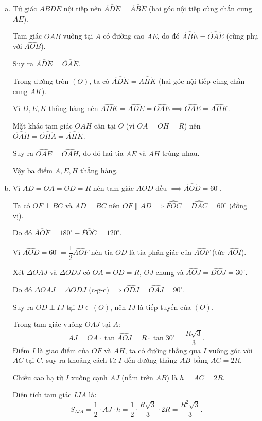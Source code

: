 \begin{bt}
{\begin{enumerate}[a)]
			Suy ra tứ giác $ABDE$ nội tiếp đường tròn đường kính $AB$.
			\item Tứ giác $ABDE$ nội tiếp nên $\widehat{ADE} = \widehat{ABE}$ (hai góc nội tiếp cùng chắn cung $AE$).
			
			Tam giác $OAB$ vuông tại $A$ có đường cao $AE$, do đó $\widehat{ABE} = \widehat{OAE}$ (cùng phụ với $\widehat{AOB}$).
			
			Suy ra $\widehat{ADE} = \widehat{OAE}$.
			
			Trong đường tròn $(O)$, ta có $\widehat{ADK} = \widehat{AHK}$ (hai góc nội tiếp cùng chắn cung $AK$).
			
			Vì $D, E, K$ thẳng hàng nên $\widehat{ADK} = \widehat{ADE} = \widehat{OAE} \implies \widehat{OAE} = \widehat{AHK}$.
			
			Mặt khác tam giác $OAH$ cân tại $O$ (vì $OA = OH = R$) nên $\widehat{OAH} = \widehat{OHA} = \widehat{AHK}$.
			
			Suy ra $\widehat{OAE} = \widehat{OAH}$, do đó hai tia $AE$ và $AH$ trùng nhau.
			
			Vậy ba điểm $A, E, H$ thẳng hàng.
			\item Vì $AD = OA = OD = R$ nên tam giác $AOD$ đều $\implies \widehat{AOD} = 60^\circ$.
			
			Ta có $OF \perp BC$ và $AD \perp BC$ nên $OF \parallel AD \implies \widehat{FOC} = \widehat{DAC} = 60^\circ$ (đồng vị).
			
			Do đó $\widehat{AOF} = 180^\circ - \widehat{FOC} = 120^\circ$.
			
			Vì $\widehat{AOD} = 60^\circ = \dfrac{1}{2}\widehat{AOF}$ nên tia $OD$ là tia phân giác của $\widehat{AOF}$ (tức $\widehat{AOI}$).
			
			Xét $\Delta OAJ$ và $\Delta ODJ$ có $OA = OD = R$, $OJ$ chung và $\widehat{AOJ} = \widehat{DOJ} = 30^\circ$.
			
			Do đó $\Delta OAJ = \Delta ODJ\text{ (c-g-c)} \implies \widehat{ODJ} = \widehat{OAJ} = 90^\circ$.
			
			Suy ra $OD \perp IJ$ tại $D \in (O)$, nên $IJ$ là tiếp tuyến của $(O)$.
			
			Trong tam giác vuông $OAJ$ tại $A$:
			$$AJ = OA \cdot \tan\widehat{AOJ} = R \cdot \tan 30^\circ = \dfrac{R\sqrt{3}}{3}.$$
			Điểm $I$ là giao điểm của $OF$ và $AH$, ta có đường thẳng qua $I$ vuông góc với $AC$ tại $C$, suy ra khoảng cách từ $I$ đến đường thẳng $AB$ bằng $AC = 2R$.
			
			Chiều cao hạ từ $I$ xuống cạnh $AJ$ (nằm trên $AB$) là $h = AC = 2R$.
			
			Diện tích tam giác $IJA$ là:
			$$S_{IJA} = \dfrac{1}{2} \cdot AJ \cdot h = \dfrac{1}{2} \cdot \dfrac{R\sqrt{3}}{3} \cdot 2R = \dfrac{R^2\sqrt{3}}{3}.$$
		\end{enumerate}
}
\end{bt}

